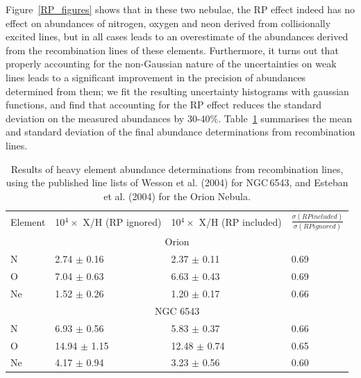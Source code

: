 \documentclass[useAMS,usenatbib]{mn2e}
\begin{document}
Figure~\ref{RP_figures} shows that in these two nebulae, the RP effect indeed has no effect on abundances of nitrogen, oxygen and neon derived from collisionally excited lines, but in all cases leads to an overestimate of the abundances derived from the recombination lines of these elements.  Furthermore, it turns out that properly accounting for the non-Gaussian nature of the uncertainties on weak lines leads to a significant improvement in the precision of abundances determined from them; we fit the resulting uncertainty histograms with gaussian functions, and find that accounting for the RP effect reduces the standard deviation on the measured abundances by 30-40\%.  Table~\ref{RP_numbers} summarises the mean and standard deviation of the final abundance determinations from recombination lines.

\begin{table}
\begin{tabular}{l ll l}
Element & 10$^4 \times$ X/H (RP ignored) & 10$^4 \times$ X/H (RP included) & $\frac{\sigma (RP included)}{\sigma (RP ignored)}$ \\
\multicolumn{4}{c}{Orion}\\

N & 2.74 $\pm$ 0.16 & 2.37 $\pm$ 0.11 & 0.69 \\
O & 7.04 $\pm$ 0.63 & 6.63 $\pm$ 0.43 & 0.69 \\
Ne & 1.52 $\pm$ 0.26 & 1.20 $\pm$ 0.17 & 0.66 \\

\multicolumn{4}{c}{NGC 6543} \\

N & 6.93 $\pm$  0.56 & 5.83 $\pm$  0.37 & 0.66 \\
O & 14.94 $\pm$ 1.15 & 12.48 $\pm$ 0.74 & 0.65 \\
Ne & 4.17 $\pm$ 0.94 & 3.23 $\pm$ 0.56 & 0.60 \\

\end{tabular}
\caption{Results of heavy element abundance determinations from recombination lines, using the published line lists of Wesson et al. (2004) for NGC\,6543, and Esteban et al. (2004) for the Orion Nebula.}
\label{RP_numbers}
\end{table}
\end{document}
